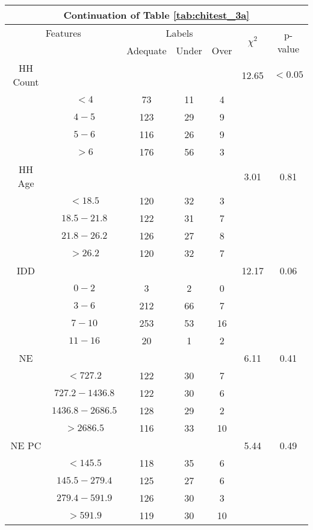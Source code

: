 \begin{table}
\centering
\label{tab:chitest_3a_cont}
\begin{tabular}{c c | c c c| c | c}
\hline
\multicolumn{7}{c}{Continuation of Table \ref{tab:chitest_3a}}\\ 
\hline
\multicolumn{2}{c|}{Features}& \multicolumn{3}{c|}{Labels}& \multirow{2}{*}{$\chi^2$} & \multirow{2}{*}{p-value}\\ 
& & Adequate & Under & Over & & \\ 
\hline
HH Count &  &  &  & & 12.65 & $< 0.05$ \\ 
& $< 4$ & 73 & 11 & 4& & \\ 
& $4-5$ & 123 & 29 & 9& & \\ 
& $5-6$ & 116 & 26 & 9& & \\ 
& $> 6$ & 176 & 56 & 3& & \\ 
\hline 
HH Age &  &  &  & & 3.01 & 0.81 \\ 
& $< 18.5$ & 120 & 32 & 3& & \\ 
& $18.5-21.8$ & 122 & 31 & 7& & \\ 
& $21.8-26.2$ & 126 & 27 & 8& & \\ 
& $> 26.2$ & 120 & 32 & 7& & \\ 
\hline 
IDD &  &  &  & & 12.17 & 0.06 \\ 
& $0-2$ & 3 & 2 & 0& & \\ 
& $3-6$ & 212 & 66 & 7& & \\ 
& $7-10$ & 253 & 53 & 16& & \\ 
& $11-16$ & 20 & 1 & 2& & \\ 
\hline 
NE &  &  &  & & 6.11 & 0.41 \\ 
& $< 727.2$ & 122 & 30 & 7& & \\ 
& $727.2-1436.8$ & 122 & 30 & 6& & \\ 
& $1436.8-2686.5$ & 128 & 29 & 2& & \\ 
& $> 2686.5$ & 116 & 33 & 10& & \\ 
\hline 
NE PC &  &  &  & & 5.44 & 0.49 \\ 
& $< 145.5$ & 118 & 35 & 6& & \\ 
& $145.5-279.4$ & 125 & 27 & 6& & \\ 
& $279.4-591.9$ & 126 & 30 & 3& & \\ 
& $> 591.9$ & 119 & 30 & 10& & \\ 
\hline 
\end{tabular}
\end{table}

